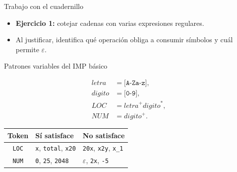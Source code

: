 \documentclass[11pt,spanish]{beamer}
\newcommand{\actividad}[1]{\textbf{\textcolor{Rojo}{#1}}}
\begin{document}
\begin{frame}{Trabajo con el cuadernillo}
\vfill

\begin{center}
\end{center}

\bigskip
\begin{itemize}
\item \textbf{Ejercicio 1:} cotejar cadenas con varias expresiones regulares.
\item Al justificar, identifica qué operación obliga a consumir símbolos y cuál permite \(\varepsilon\).
\end{itemize}

\vfill
\end{frame}

\begin{frame}{Patrones variables del IMP básico}
\vfill

\[
\begin{aligned}
\mathit{letra}  & = \texttt{[A-Za-z]},\\
\mathit{digito} & = \texttt{[0-9]},\\
\mathit{LOC}    & = \mathit{letra}^{+}\mathit{digito}^{*},\\
\mathit{NUM}    & = \mathit{digito}^{+}.
\end{aligned}
\]

\begin{center}
\small
\renewcommand{\arraystretch}{1.2}
\begin{tabular}{|c|L{.25\textwidth}|L{.31\textwidth}|}
\hline
\textbf{Token} & \textbf{Sí satisface} & \textbf{No satisface} \tabularnewline
\hline
\texttt{LOC} & \texttt{x}, \texttt{total}, \texttt{x20} & \texttt{20x}, \texttt{x2y}, \texttt{x\_1} \tabularnewline
\hline
\texttt{NUM} & \texttt{0}, \texttt{25}, \texttt{2048} & \(\varepsilon\), \texttt{2x}, \texttt{-5} \tabularnewline
\hline
\end{tabular}
\end{center}

\vfill
\end{frame}
\end{document}
